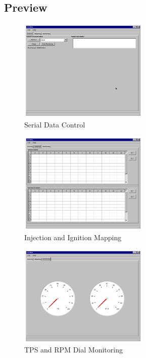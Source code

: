 \documentclass[a4paper,12pt,oneside,pdflatex,italian,final,twocolumn]{article}
\begin{document}
	\subsection{Preview}
	
	\centering
	\begin{figure} [h]
		\centering
		\includegraphics[width=0.55\textwidth,]{images/iface_main.png}
		\caption{Serial Data Control}
	\end{figure}
	
	\begin{figure} [h]
		\centering
		\includegraphics[width=0.55\textwidth,]{images/iface_map.png}
		\caption{Injection and Ignition Mapping}
	\end{figure}

	\newpage
	\begin{figure} [h]
		\centering
		\includegraphics[width=0.55\textwidth,]{images/iface_dial.png}
		\caption{TPS and RPM Dial Monitoring}
	\end{figure}
	
\end{document}
